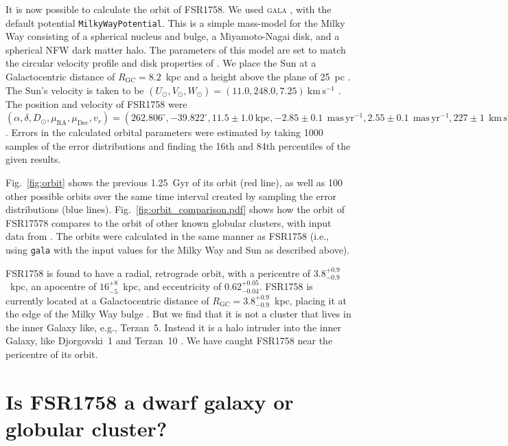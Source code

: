 \documentclass[fleqn,usenatbib]{mnras}
\newcommand{\kms}{~\ensuremath{\textrm{km}\,\textrm{s}^{-1}}}
\newcommand{\masyr}{~\ensuremath{\textrm{mas}\,\textrm{yr}^{-1}}}
\begin{document}
It is now possible to calculate the orbit of FSR1758. We used \textsc{gala} \citep[version 0.3;][]{Price-Whelan2017a,Price-Whelan2018b}, with the default potential \texttt{MilkyWayPotential}. This is a simple mass-model for the Milky Way consisting of a spherical nucleus and bulge, a Miyamoto-Nagai disk, and a spherical NFW dark matter halo. The parameters of this model are set to match the circular velocity profile and disk properties of \citet{Bovy:2015gg}. We place the Sun at a Galactocentric distance of $R_\mathrm{GC}=8.2$~kpc and a height above the plane of 25~pc \citep{BlandHawthorn:2016iq}. The Sun's velocity is taken to be $(U_\odot,V_\odot,W_\odot)=(11.0,248.0,7.25)\kms$ \citep{Schonrich2012}. The position and velocity of FSR1758 were $(\alpha,\delta,D_\odot,\mu_\mathrm{RA},\mu_\mathrm{Dec},v_r)=(262.806^\circ,-39.822^\circ,11.5\pm1.0~\mathrm{kpc},-2.85\pm0.1~\mathrm{\masyr},2.55\pm0.1~\mathrm{\masyr},227\pm1~\mathrm{\kms})$. Errors in the calculated orbital parameters were estimated by taking 1000 samples of the error distributions and finding the 16th and 84th percentiles of the given results.

Fig.\ \ref{fig:orbit} shows the previous 1.25~Gyr of its orbit (red line), as well as 100 other possible orbits over the same time interval created by sampling the error distributions (blue lines). Fig.\ \ref{fig:orbit_comparison.pdf} shows how the orbit of FSR17578 compares to the orbit of other known globular clusters, with input data from \citet{Vasiliev:2018uf}. The orbits were calculated in the same manner as FSR1758 (i.e., using \texttt{gala} with the input values for the Milky Way and Sun as described above).

FSR1758 is found to have a radial, retrograde orbit, with a pericentre of $3.8_{-0.9}^{+0.9}$~kpc, an apocentre of $16_{-5}^{+8}$~kpc, and eccentricity of $0.62_{-0.04}^{+0.05}$.  FSR1758 is currently located at a Galactocentric distance of $R_\mathrm{GC} = 3.8_{-0.9}^{+0.9}$~kpc, placing it at the edge of the Milky Way bulge \citep[clusters within $\sim3$~kpc of the Galactic centre tend to be classified as `bulge' clusters;][]{Barbuy2018}. But we find that it is not a cluster that lives in the inner Galaxy like, e.g., Terzan~5. Instead it is a halo intruder into the inner Galaxy, like Djorgovski~1 and Terzan~10 \citep{Ortolani2019}. We have caught FSR1758 near the pericentre of its orbit.

\section{Is FSR1758 a dwarf galaxy or globular cluster?}\label{sec:halo}
\end{document}
